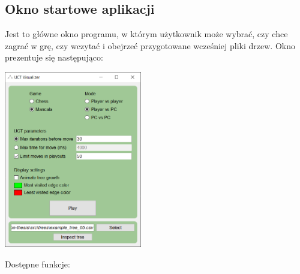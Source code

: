 \documentclass{article}
\begin{document}
\subsection{Okno startowe aplikacji}
Jest to główne okno programu, w którym użytkownik może wybrać, czy chce zagrać w grę, czy wczytać i obejrzeć przygotowane wcześniej pliki drzew. Okno prezentuje się następująco:
\begin{center}
	\includegraphics[width=0.45\textwidth]{main-app-window}
\end{center}
Dostępne funkcje:\\
\end{document}

